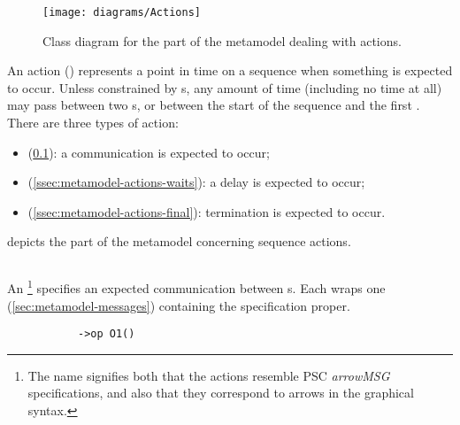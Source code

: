 \begin{figure}[htb]
	\centering
	\texttt{[image: diagrams/Actions]}
	\caption{Class diagram for the part of the \langname{} metamodel dealing with actions.}
	\label{fig:metamodel-actions}
\end{figure}

An action (\msequenceaction{}) represents a point in time on a
sequence when something is expected to occur.  Unless constrained by
\mdeadlinestep s, any amount of time (including no time at all) may
pass between two \msequenceaction s, or between the start of the
sequence and the first \msequenceaction.  There are three types of
action:
\begin{itemize}
\item \marrowaction{} (\cref{ssec:metamodel-actions-arrows}):
  a communication is expected to occur;
\item \mwaitaction{} (\cref{ssec:metamodel-actions-waits}):
  a delay is expected to occur;
\item \mfinalaction{} (\cref{ssec:metamodel-actions-final}):
  termination is expected to occur.
\end{itemize}

 depicts the part of the metamodel concerning
sequence actions.

\subsection{\marrowaction}\label{ssec:metamodel-actions-arrows}

An \marrowaction\footnote{The name signifies both that the actions resemble
PSC \emph{arrowMSG} specifications, and also that they correspond to arrows in
the graphical syntax.} specifies an expected communication between \mactor s.
Each \marrowaction{} wraps one
\mmessagespec{} (\cref{sec:metamodel-messages})
containing the specification proper.

\begin{figure}[H]
\begin{subfigure}[t]{\egtextwidth}
\begin{lstlisting}[style=Example]
->op O1()
\end{lstlisting}
\end{subfigure}
\hfill
\begin{subfigure}[t]{\eggraphicalwidth}
\gsecaption
\centering
{}
\end{subfigure}

\end{figure}

